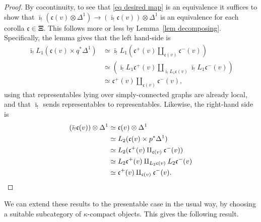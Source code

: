 \documentclass{amsart}
\numberwithin{theorem}{subsection}
\theoremstyle{definition}
\newcommand{\xfc}{\mathfrak{c}}
\newcommand{\gc}{\mathbf{\Xi}}
\newcommand{\gcone}{\gc}
\newcommand{\barishriek}{\bar \imath_!}
\begin{document}
\begin{proof}
By cocontinuity, to see that \eqref{eq desired map} is an equivalence it suffices to show that $\barishriek(\xfc(v) \otimes \Delta^1) \to (\barishriek \xfc(v))\otimes \Delta^1$ is an equivalence for each corolla $\xfc \in \gcone$.
This follows more or less by Lemma~\ref{lem decomposing}.
Specifically, the lemma gives that the left hand-side is 
\begin{align*}
\barishriek L_1 (\xfc(v) \times q^* \Delta^1) & \simeq
\barishriek L_1 (\xfc^+(v) \amalg_{\xfc(v)} \xfc^-(v)) \\ & \simeq  
(\barishriek L_1 \xfc^+(v) \amalg_{\barishriek L_1 \xfc(v)} \barishriek L_1 \xfc^-(v)) \\ & \simeq 
\xfc^+(v) \amalg_{\xfc(v)} \xfc^-(v),
\end{align*}
using that representables lying over simply-connected graphs are already local, and that $\barishriek$ sends representables to representables.
Likewise, the right-hand side is 
\begin{align*}
(\barishriek \xfc(v)) \otimes \Delta^1 &\simeq \xfc(v) \otimes \Delta^1 \\ &\simeq 
L_2 (\xfc(v) \times p^* \Delta^1) \\ &\simeq 
L_2 (\xfc^+(v) \amalg_{\xfc(v)} \xfc^-(v)) \\ &\simeq 
L_2\xfc^+(v) \amalg_{L_2\xfc(v)} L_2\xfc^-(v) \\ & \simeq
\xfc^+(v) \amalg_{\xfc(v)} \xfc^-(v).
\qedhere
\end{align*}
\end{proof}

We can extend these results to the presentable case in the usual way, by choosing a suitable subcategory of $\kappa$-compact objects.
This gives the following result.
\end{document}
